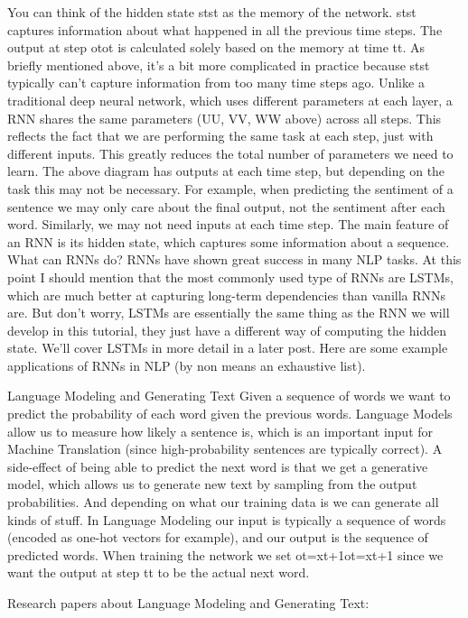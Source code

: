 You can think of the hidden state stst as the memory of the network. stst captures information about what happened in all the previous time steps. The output at step otot is calculated solely based on the memory at time tt. As briefly mentioned above, it’s a bit more complicated in practice because stst typically can’t capture information from too many time steps ago.
Unlike a traditional deep neural network, which uses different parameters at each layer, a RNN shares the same parameters (UU, VV, WW above) across all steps. This reflects the fact that we are performing the same task at each step, just with different inputs. This greatly reduces the total number of parameters we need to learn.
The above diagram has outputs at each time step, but depending on the task this may not be necessary. For example, when predicting the sentiment of a sentence we may only care about the final output, not the sentiment after each word. Similarly, we may not need inputs at each time step. The main feature of an RNN is its hidden state, which captures some information about a sequence.
What can RNNs do?
RNNs have shown great success in many NLP tasks. At this point I should mention that the most commonly used type of RNNs are LSTMs, which are much better at capturing long-term dependencies than vanilla RNNs are. But don’t worry, LSTMs are essentially the same thing as the RNN we will develop in this tutorial, they just have a different way of computing the hidden state. We’ll cover LSTMs in more detail in a later post. Here are some example applications of RNNs in NLP (by non means an exhaustive list).

Language Modeling and Generating Text
Given a sequence of words we want to predict the probability of each word given the previous words. Language Models allow us to measure how likely a sentence is, which is an important input for Machine Translation (since high-probability sentences are typically correct). A side-effect of being able to predict the next word is that we get a generative model, which allows us to generate new text by sampling from the output probabilities. And depending on what our training data is we can generate all kinds of stuff. In Language Modeling our input is typically a sequence of words (encoded as one-hot vectors for example), and our output is the sequence of predicted words. When training the network we set ot=xt+1ot=xt+1 since we want the output at step tt to be the actual next word.

Research papers about Language Modeling and Generating Text:

